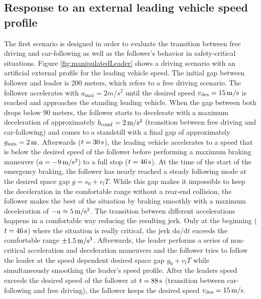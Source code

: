 \documentclass[review]{elsarticle}
\providecommand{\sub}[1]{_{\mathrm{#1}}}  %
\providecommand{\3}{{\ss}}
\begin{document}
\subsection{Response to an external leading vehicle speed profile}
The first scenario is designed in order to evaluate the transition between free driving and car-following as well as the follower's behavior in safety-critical situations. 
Figure \ref{fig:manipulatedLeader} shows a driving scenario with an
artificial external profile for the leading vehicle speed. The initial
gap between 
follower and leader is 200 meters, which refers to a free driving
scenario. The follower accelerates with $a\sub{max} = 2m/s^2$ until
the desired speed $v\sub{des} = \unit[15]{m/s} $ is reached and approaches
the standing leading vehicle. When the gap between both drops below 90
meters, the follower starts to decelerate with a maximum
  deceleration of approximately $b_{\rm
  comf} = \unit[2]{m/s^2}$ (transition between free driving and car-following)
and comes to a standstill with a final gap of approximately 
$g\sub{min} = \unit[2]{m}$. Afterwards ($t=\unit[30]{s}$),  the leading vehicle accelerates to a speed
that is below the desired speed of the follower before performing a
maximum braking maneuver ($a=\unit[-9]{m/s^2}$) to a full stop ($t=\unit[46]{s}$). At the time of the start of the
  emergency braking, the follower has nearly reached a steady
  following mode at the desired space gap $g=s_0+v_l T$. While this
  gap makes it impossible to keep the deceleration in the comfortable
  range without a rear-end collision, the follower makes the best of
  the situation by braking smoothly with a maximum deceleration of $-a
  \approx \unit[5]{m/s^2}$.  The transition between different
accelerations happens in a comfortable way reducing the resulting
jerk. Only at the beginning ($t=\unit[46]{s}$) where the situation is
really critical, the jerk $\text{d}a/\text{d}t$ exceeds the comfortable range 
$\pm \unit[1.5]{m/s^3}$. Afterwards, the leader performs a series of
non-critical acceleration and deceleration maneuvers and the follower
tries to follow the leader at the speed dependent desired space gap
$g_0+v_lT$ while simultaneously smoothing the leader's speed profile. After the leaders speed exceeds the desired speed of the follower at $t=\unit[88]{s}$ (transition between car-following and free driving), the follower keeps the desired speed $v\sub{des} = \unit[15]{m/s} $.
\end{document}
